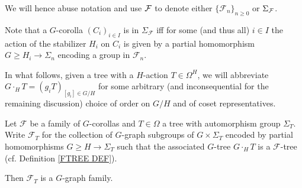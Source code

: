 \documentclass[a4paper,10pt]{article}%
\begin{document}
%
%

We will hence abuse notation and use $\mathcal F$ to denote either $\{\mathcal{F}_n\}_{n \geq 0}$
or $\Sigma_{\mathcal F}$.

Note that a $G$-corolla $(C_i)_{i \in I}$
is in $\Sigma_\mathcal{F}$
iff for some (and thus all) 
$i \in I$ the action of the stabilizer 
$H_i$ on $C_i$
is given by a partial homomorphism
$G \geq H_i \to \Sigma_n$
encoding a group in $\mathcal{F}_n$.


In what follows, given a tree with a $H$-action
$T \in \Omega^H$,
we will abbreviate
$G \cdot_H T = (g_i T)_{[g_i] \in G/H}$
for some arbitrary (and inconsequential for the remaining discussion) choice of order on $G/H$ and of coset representatives.


\begin{proposition}
Let $\mathcal{F}$ be a family of $G$-corollas and $T \in \Omega$ a tree with automorphism group $\Sigma_T$.
	Write $\mathcal{F}_T$ for the collection of $G$-graph subgroups of 
	$G \times \Sigma_T$ encoded by partial homomorphisms
	$G \geq H \to \Sigma_T$ such that the associated $G$-tree
	$G \cdot_H T$ is a $\mathcal{F}$-tree
	(cf. Definition \ref{FTREE DEF}).
	
	Then $\mathcal{F}_T$ is a $G$-graph family.
\end{proposition}
\end{document}
